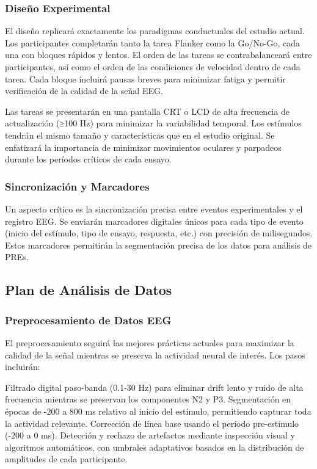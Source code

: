 \documentclass[
  spanish,
  10pt,
]{article}
\begin{document}
\subsubsection{Diseño Experimental}\label{diseuxf1o-experimental}

El diseño replicará exactamente los paradigmas conductuales del estudio
actual. Los participantes completarán tanto la tarea Flanker como la
Go/No-Go, cada una con bloques rápidos y lentos. El orden de las tareas
se contrabalanceará entre participantes, así como el orden de las
condiciones de velocidad dentro de cada tarea. Cada bloque incluirá
pausas breves para minimizar fatiga y permitir verificación de la
calidad de la señal EEG.

Las tareas se presentarán en una pantalla CRT o LCD de alta frecuencia
de actualización (≥100 Hz) para minimizar la variabilidad temporal. Los
estímulos tendrán el mismo tamaño y características que en el estudio
original. Se enfatizará la importancia de minimizar movimientos oculares
y parpadeos durante los períodos críticos de cada ensayo.

\subsubsection{Sincronización y
Marcadores}\label{sincronizaciuxf3n-y-marcadores}

Un aspecto crítico es la sincronización precisa entre eventos
experimentales y el registro EEG. Se enviarán marcadores digitales
únicos para cada tipo de evento (inicio del estímulo, tipo de ensayo,
respuesta, etc.) con precisión de milisegundos. Estos marcadores
permitirán la segmentación precisa de los datos para análisis de PREs.

\subsection{Plan de Análisis de
Datos}\label{plan-de-anuxe1lisis-de-datos}

\subsubsection{Preprocesamiento de Datos
EEG}\label{preprocesamiento-de-datos-eeg}

El preprocesamiento seguirá las mejores prácticas actuales para
maximizar la calidad de la señal mientras se preserva la actividad
neural de interés. Los pasos incluirán:

Filtrado digital paso-banda (0.1-30 Hz) para eliminar drift lento y
ruido de alta frecuencia mientras se preservan los componentes N2 y P3.
Segmentación en épocas de -200 a 800 ms relativo al inicio del estímulo,
permitiendo capturar toda la actividad relevante. Corrección de línea
base usando el período pre-estímulo (-200 a 0 ms). Detección y rechazo
de artefactos mediante inspección visual y algoritmos automáticos, con
umbrales adaptativos basados en la distribución de amplitudes de cada
participante.
\end{document}
